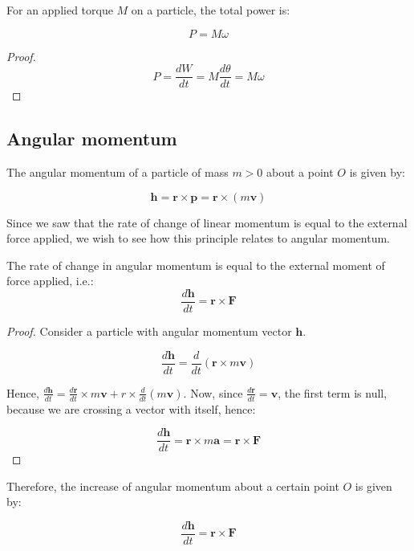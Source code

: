 \documentclass[12pt]{article}
\begin{document}
\begin{theorem}
    For an applied torque $M$ on a particle, the total power is:

    \[ P = M\omega \]
\end{theorem}

\begin{proof}
    \[ P = \frac{dW}{dt} = M\frac{d\theta}{dt} = M\omega \]
\end{proof}

\subsection{Angular momentum}

\begin{definition}
    The angular momentum of a particle of mass $m > 0$ about a point $O$ is given by:

    \[ \mathbf{h} = \mathbf{r} \times \mathbf{p} = \mathbf{r} \times \left(m\mathbf{v}\right) \]
\end{definition}

Since we saw that the rate of change of linear momentum is equal to the external force applied, we wish to see how this principle relates to angular momentum. 

\begin{theorem}
    The rate of change in angular momentum is equal to the external moment of force applied, i.e.:
    \[ \frac{d\mathbf{h}}{dt} = \mathbf{r} \times \mathbf{F} \]
\end{theorem}

\begin{proof}
    Consider a particle with angular momentum vector $\mathbf{h}$.

    \[ \frac{d\mathbf{h}}{dt} = \frac{d}{dt}\left(\mathbf{r} \times m\mathbf{v}\right) \]

    Hence, $\frac{d\mathbf{h}}{dt} = \frac{d\mathbf{r}}{dt} \times m\mathbf{v} + r \times \frac{d}{dt} (m\mathbf{v})$. Now, since $\frac{d\mathbf{r}}{dt} = \mathbf{v}$, the first term is null, because we are crossing a vector with itself, hence:

    \[ \frac{d\mathbf{h}}{dt} = \mathbf{r} \times m\mathbf{a} = \mathbf{r} \times \mathbf{F} \]
\end{proof}

Therefore, the increase of angular momentum about a certain point $O$ is given by:

\[ \frac{d\mathbf{h}}{dt} = \mathbf{r} \times \mathbf{F} \]
\end{document}
